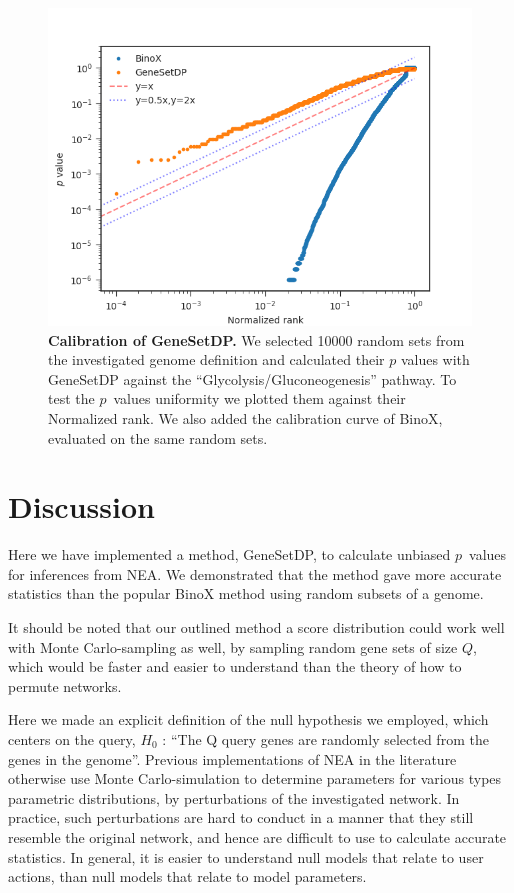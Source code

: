 \documentclass[a4paper,american]{lipics-v2016}
\begin{document}
\begin{figure}[htb]
		\begin{center}
				\includegraphics[scale=0.8]{figures/F2_calibration.png}
		\end{center}

  \caption{{\bf Calibration of GeneSetDP.} We selected 10000 random sets from the investigated genome definition and calculated their $p$ values with GeneSetDP against the ``Glycolysis/Gluconeogenesis'' pathway. To test the $p$~values uniformity we plotted them against their Normalized rank. We also added the calibration curve of BinoX, evaluated on the same random sets.}
  \label{fig:calibration}
\end{figure}


\section*{Discussion}

Here we have implemented a method, GeneSetDP, to calculate unbiased $p$~values for inferences from NEA. We demonstrated that the method gave more accurate statistics than the popular BinoX method using random subsets of a genome.

It should be noted that our outlined method a score distribution could work well with Monte Carlo-sampling as well, by sampling random gene sets of size $Q$, which would be faster and easier to understand than the theory of how to permute networks.

Here we made an explicit definition of the null hypothesis we employed, which centers on the query, $H_0$ : ``The Q query genes are randomly selected from the genes in the genome''. Previous implementations of NEA in the literature otherwise use Monte Carlo-simulation to determine parameters for various types parametric distributions, by perturbations of the investigated network. In practice, such perturbations are hard to conduct in a manner that they still resemble the original network, and hence are difficult to use to calculate accurate statistics. In general, it is easier to understand null models that relate to user actions, than null models that relate to model parameters.


\end{document}
